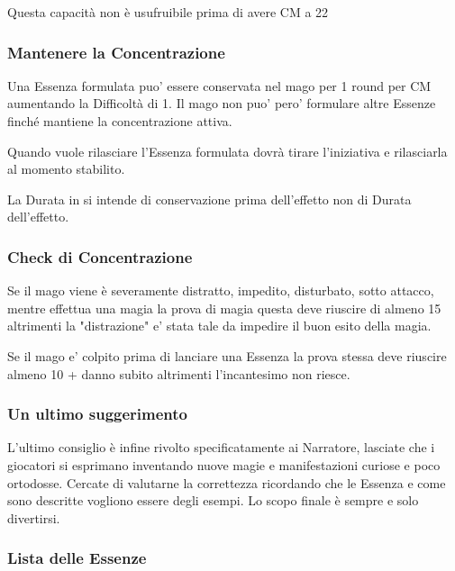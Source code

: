 \documentclass[a4paper,10 pt,twoside,openany]{book}
\begin{document}
Questa capacità non è usufruibile prima di avere CM a 22

\subsubsection{Mantenere la Concentrazione}

Una Essenza formulata puo' essere conservata nel mago per 1 round per CM aumentando la Difficoltà di 1.
Il mago non puo' pero' formulare altre Essenze finché mantiene la concentrazione attiva.

Quando vuole rilasciare l'Essenza formulata dovrà tirare l'iniziativa e rilasciarla al momento stabilito.

La Durata in si intende di conservazione prima dell'effetto non di Durata dell'effetto.

\subsubsection{Check di Concentrazione}

Se il mago viene è severamente distratto, impedito, disturbato, sotto attacco, mentre effettua una magia la prova di magia questa deve riuscire di almeno 15 altrimenti la "distrazione" e' stata tale da impedire il buon esito della magia.

Se il mago e' colpito prima di lanciare una Essenza la prova stessa deve riuscire almeno 10 + danno subito altrimenti l'incantesimo non riesce.

\subsubsection{Un ultimo suggerimento}

L'ultimo consiglio è infine rivolto specificatamente ai Narratore, lasciate che i giocatori si esprimano inventando nuove magie e manifestazioni curiose e poco ortodosse. Cercate di valutarne la correttezza ricordando che le Essenza e come sono descritte vogliono essere degli esempi. Lo scopo finale è sempre e solo divertirsi.

\subsubsection{Lista delle Essenze}
\end{document}
